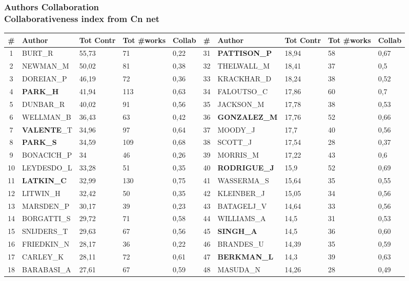 \documentclass[hyperref={pdfstartview={FitBH -32768},
                         pdfpagemode=FullScreen,
                         plainpages=false,
                         colorlinks=true}
              ]{beamer}
\begin{document}
\begin{frame}[fragile]
\frametitle{Authors Collaboration \\ \normalsize Collaborativeness index from Cn net}

\renewcommand{\arraystretch}{0.82}
\tiny
\begin{tabular}{c|l|p{0.4cm}|p{0.6cm}|p{0.4cm}||c|l|p{0.4cm}|p{0.6cm}|p{0.4cm}|} 
\# & Author & Tot Contr & Tot \#works & Collab & \# & Author & Tot Contr & Tot \#works & Collab \\ \hline
1& 	BURT\_R& 	55,73& 	71& 	0,22& 	31& 	\textbf{PATTISON\_P}& 	18,94& 	58& 	0,67\\
2& 	NEWMAN\_M& 	50,02& 	81& 	0,38& 	32& 	THELWALL\_M& 	18,41& 	37& 	0,5\\
3& 	DOREIAN\_P& 	46,19& 	72& 	0,36& 	33& 	KRACKHAR\_D& 	18,24& 	38& 	0,52\\
4& 	\textbf{PARK\_H}& 	41,94& 	113& 	0,63& 	34& 	FALOUTSO\_C& 	17,86& 	60& 	0,7\\
5& 	DUNBAR\_R& 	40,02& 	91& 	0,56& 	35& 	JACKSON\_M& 	17,78& 	38& 	0,53\\
6& 	WELLMAN\_B& 	36,43& 	63& 	0,42& 	36& 	\textbf{GONZALEZ\_M}& 	17,76& 	52& 	0,66\\
7& 	\textbf{VALENTE}\_T& 	34,96& 	97& 	0,64& 	37& 	MOODY\_J& 	17,7& 	40& 	0,56\\
8& 	\textbf{PARK\_S}& 	34,59& 	109& 	0,68& 	38& 	SCOTT\_J& 	17,54& 	28& 	0,37\\
9& 	BONACICH\_P& 	34& 	46& 	0,26& 	39& 	MORRIS\_M& 	17,22& 	43& 	0,6\\
10& 	LEYDESDO\_L& 	33,28& 	51& 	0,35& 	40& 	\textbf{RODRIGUE\_J}& 	15,9& 	52& 	0,69\\
11& 	\textbf{LATKIN\_C}& 	32,99& 	130& 	0,75& 	41& 	WASSERMA\_S& 	15,64& 	35& 	0,55\\
12& 	LITWIN\_H& 	32,42& 	50& 	0,35& 	42& 	KLEINBER\_J& 	15,05& 	34& 	0,56\\
13& 	MARSDEN\_P& 	30,17& 	39& 	0,23& 	43& 	BATAGELJ\_V& 	14,64& 	33& 	0,56\\
14& 	BORGATTI\_S& 	29,72& 	71& 	0,58& 	44& 	WILLIAMS\_A& 	14,5& 	31& 	0,53\\
15& 	SNIJDERS\_T& 	29,63& 	67& 	0,56& 	45& 	\textbf{SINGH\_A}& 	14,5& 	36& 	0,60\\
16& 	FRIEDKIN\_N& 	28,17& 	36& 	0,22& 	46& 	BRANDES\_U& 	14,39& 	35& 	0,59\\
17& 	CARLEY\_K& 	28,11& 	72& 	0,61& 	47& 	\textbf{BERKMAN\_L}& 	14,3& 	39& 	0,63\\
18& 	BARABASI\_A& 	27,61& 	67& 	0,59& 	48& 	MASUDA\_N& 	14,26& 	28& 	0,49\\

\end{tabular}
\end{frame}
\end{document}
